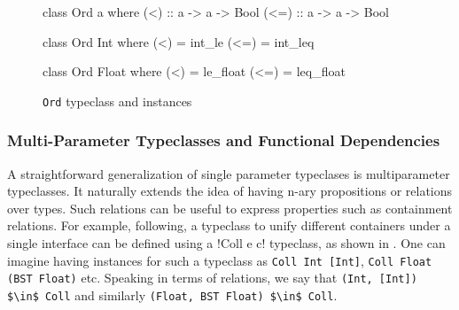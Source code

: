 \documentclass[manuscript,screen,nonacm]{acmart}
\begin{document}
\begin{figure}[ht]
  \centering
  \begin{minipage}[ht]{0.3\linewidth}
    \begin{code}
      class Ord a where
         (<)  :: a -> a -> Bool
         (<=) :: a -> a -> Bool
    \end{code}
  \end{minipage}%
  \begin{minipage}[ht]{0.3\linewidth}
    \begin{code}
      class Ord Int where
         (<)  = int_le
         (<=) = int_leq
    \end{code}
  \end{minipage}%
  \begin{minipage}[ht]{0.3\linewidth}
    \begin{code}
      class Ord Float where
         (<)  = le_float
         (<=) = leq_float
    \end{code}
  \end{minipage}
  \caption{\lstinline{Ord} typeclass and instances}
  \label{fig:tc-ord}
\end{figure}
\subsubsection{Multi-Parameter Typeclasses and Functional Dependencies}
A straightforward generalization of single parameter typeclases is multiparameter typeclasses. It naturally extends the idea of having n-ary propositions or relations over types. Such relations can be useful to express properties such as containment relations. For example, following\cite{jones_tcfd_2000}, a typeclass to unify different containers under a single interface can be defined using a !Coll e c! typeclass, as shown in . One can imagine having instances for such a typeclass as \lstinline{Coll Int [Int]}, \lstinline{Coll Float (BST Float)} etc. Speaking in terms of relations, we say that \lstinline{(Int, [Int]) $\in$ Coll} and similarly \lstinline{(Float, BST Float) $\in$ Coll}.
\end{document}
